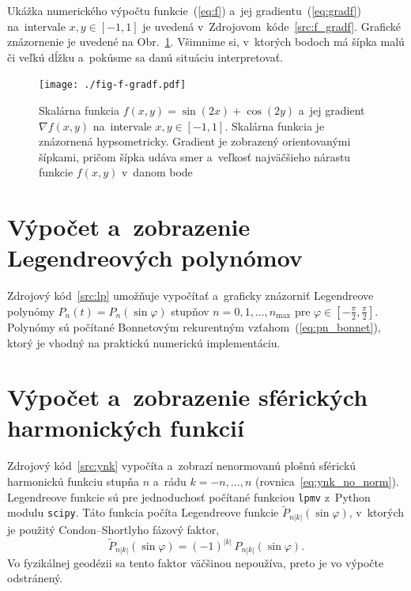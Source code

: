 \documentclass[a4paper, 12pt]{book}
\begin{document}
Ukážka numerického výpočtu funkcie~(\ref{eq:f}) a~jej 
gradientu~(\ref{eq:gradf}) na~intervale $x, y \in [-1, 1]$ je uvedená 
v~Zdrojovom~kóde~\ref{src:f_gradf}.  Grafické znázornenie je uvedené na 
Obr.~\ref{fig:f_gradf}.  Všimnime si, v~ktorých bodoch má šípka malú či veľkú 
dĺžku a~pokúsme sa danú situáciu interpretovať.



\begin{figure}[bt]
\centering
\texttt{[image: ./fig-f-gradf.pdf]}
\caption{Skalárna funkcia $f(x, y) = \sin(2x) + \cos(2y)$ a~jej gradient 
$\nabla f(x, y)$ na~intervale $x, y \in [-1, 1]$.  Skalárna funkcia je 
znázornená hypsometricky.  Gradient je zobrazený orientovanými šípkami, pričom 
šípka udáva smer a~veľkosť najväčšieho nárastu funkcie $f(x, y)$ v~danom bode}
\label{fig:f_gradf}
\end{figure}




\chapter{Výpočet a~zobrazenie Legendreových polynómov}
\label{app:lp}

Zdrojový kód~\ref{src:lp} umožňuje vypočítať a~graficky znázorniť Legendreove 
polynómy $P_n(t) = P_n(\sin\varphi)$ stupňov $n = 0, 1, \dots, n_{\max}$ pre 
$\varphi \in [-\frac{\pi}{2}, \frac{\pi}{2}]$.  Polynómy sú počítané Bonnetovým 
rekurentným vzťahom~(\ref{eq:pn_bonnet}), ktorý je vhodný na praktickú 
numerickú implementáciu.







\chapter{Výpočet a~zobrazenie sférických harmonických funkcií}
\label{app:sh}

Zdrojový kód~\ref{src:ynk} vypočíta a~zobrazí nenormovanú plošnú sférickú 
harmonickú funkciu stupňa $n$ a~rádu $k = -n, \dots, n$ 
(rovnica~\ref{eq:ynk_no_norm}).  Legendreove funkcie sú pre jednoduchosť 
počítané funkciou \texttt{lpmv} z~Python modulu \texttt{scipy}.  Táto funkcia 
počíta Legendreove funkcie $\tilde{P}_{n|k|}(\sin\varphi)$, v~ktorých je 
použitý Condon--Shortlyho fázový faktor,
%
\begin{equation}
\tilde{P}_{n|k|}(\sin\varphi) = (-1)^{|k|} \, P_{n|k|}(\sin\varphi){.}
\end{equation}
%
Vo fyzikálnej geodézii sa tento faktor väčšinou nepoužíva, preto je vo výpočte 
odstránený.
\end{document}
